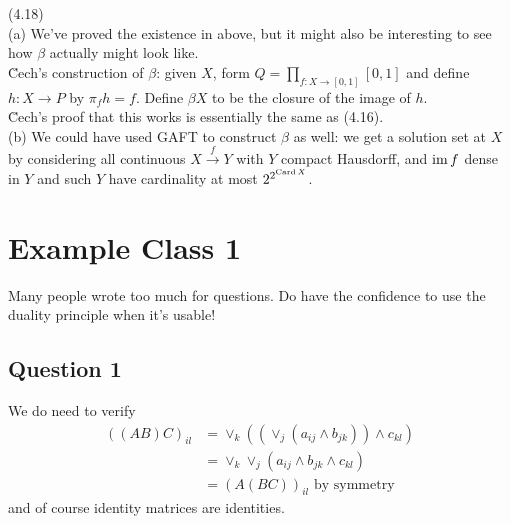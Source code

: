 \documentclass[a4paper]{article}
\begin{document}
\begin{rem} (4.18)\\
    (a) We've proved the existence in above, but it might also be interesting to see how $\beta$ actually might look like.\\
    \u{C}ech's construction of $\beta$: given $X$, form $Q = \prod_{f:X \to [0,1]} [0,1]$ and define $h:X \to P$ by $\pi_f h = f$. Define $\beta X$ to be the closure of the image of $h$.\\
    \u{C}ech's proof that this works is essentially the same as (4.16).\\
    (b) We could have used GAFT to construct $\beta$ as well: we get a solution set at $X$ by considering all continuous $X \xrightarrow{f} Y$ with $Y$ compact Hausdorff, and $\operatorname{im} f$ dense in $Y$ and such $Y$ have cardinality at most $2^{2^{\operatorname{Card} X}}$.
\end{rem}










\newpage

\section{Example Class 1}
Many people wrote too much for questions. Do have the confidence to use the duality principle when it's usable!

\subsection{Question 1}
We do need to verify
\begin{equation*}
    \begin{aligned}
        ((AB)C)_{il} &= \vee_k ((\vee_j (a_{ij} \wedge b_{jk} )) \wedge c_{kl})\\
        &= \vee_k \vee_j (a_{ij} \wedge b_{jk} \wedge c_{kl})\\
        &= (A(BC))_{il} \text{ by symmetry}
    \end{aligned}
\end{equation*}
and of course identity matrices are identities.
\end{document}
